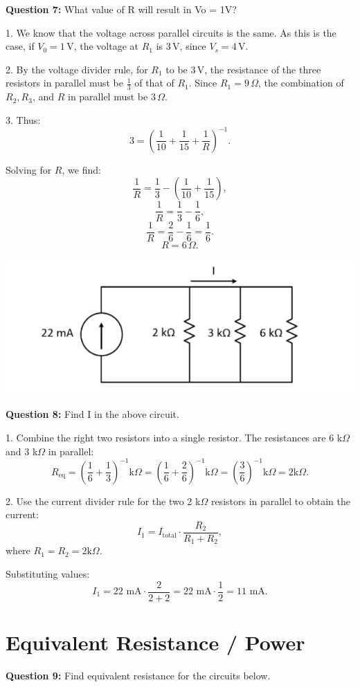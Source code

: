 \documentclass{article}
\begin{document}
\textbf{Question 7:} What value of R will result in Vo = 1V?

1. We know that the voltage across parallel circuits is the same. As this is the case, if \( V_0 = 1 \, \text{V} \), the voltage at \( R_1 \) is \( 3 \, \text{V} \), since \( V_s = 4 \, \text{V} \).

2. By the voltage divider rule, for \( R_1 \) to be \( 3 \, \text{V} \), the resistance of the three resistors in parallel must be \(\frac{1}{3}\) of that of \( R_1 \). Since \( R_1 = 9 \, \Omega \), the combination of \( R_2, R_3 \), and \( R \) in parallel must be \( 3 \, \Omega \).

3. Thus:
\[
3 = \left( \frac{1}{10} + \frac{1}{15} + \frac{1}{R} \right)^{-1}.
\]

Solving for \( R \), we find:
\[
\frac{1}{R} = \frac{1}{3} - \left( \frac{1}{10} + \frac{1}{15} \right),
\]
\[
\frac{1}{R} = \frac{1}{3} - \frac{1}{6},
\]
\[
\frac{1}{R} = \frac{2}{6} - \frac{1}{6} = \frac{1}{6}.
\]
\[
R = 6 \, \Omega.
\]

\begin{center}
\includegraphics[width=0.75\linewidth]{figures/6.png}
\end{center}

\textbf{Question 8:} Find I in the above circuit.

1. Combine the right two resistors into a single resistor. The resistances are 6 k$\Omega$ and 3 k$\Omega$ in parallel:
\[
R_{\text{eq}} = \left( \frac{1}{6} + \frac{1}{3} \right)^{-1} \text{k}\Omega = \left( \frac{1}{6} + \frac{2}{6} \right)^{-1} \text{k}\Omega = \left( \frac{3}{6} \right)^{-1} \text{k}\Omega = 2 \text{k}\Omega.
\]

2. Use the current divider rule for the two 2 k$\Omega$ resistors in parallel to obtain the current:
\[
I_1 = I_{\text{total}} \cdot \frac{R_2}{R_1 + R_2},
\]
where \( R_1 = R_2 = 2 \text{k}\Omega \).

Substituting values:
\[
I_1 = 22 \text{ mA} \cdot \frac{2}{2 + 2} = 22 \text{ mA} \cdot \frac{1}{2} = 11 \text{ mA}.
\]

\section*{Equivalent Resistance / Power}
\textbf{Question 9:} Find equivalent resistance for the circuits below.
\end{document}
